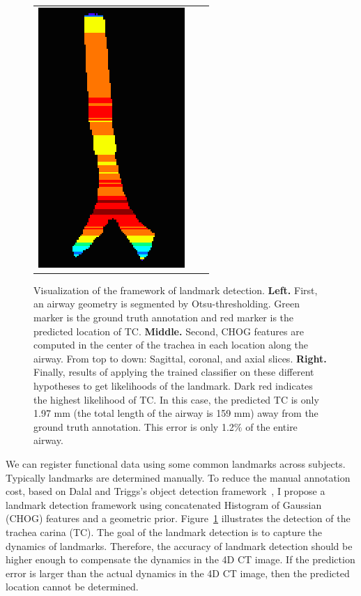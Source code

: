 \begin{figure}[tb]
\begin{center}
\begin{tabular}{ccc}
    \includegraphics[height=\figheight] {fig/Fleck_005_likelihood.png}
    \end{tabular}
    \caption{ \label{fig:detection} Visualization of the framework of landmark detection. {\bf Left.} First, an airway geometry is segmented by Otsu-thresholding. Green marker is the ground truth annotation and red marker is the predicted location of TC. {\bf Middle.} Second, CHOG features are computed in the center of the trachea in each location along the airway. From top to down: Sagittal, coronal, and axial slices. {\bf Right.} Finally, results of applying the trained classifier on these different hypotheses to get likelihoods of the landmark. Dark red indicates the highest likelihood of TC. In this case, the predicted TC is only 1.97 mm (the total length of the airway is 159 mm) away from the ground truth annotation. This error is only 1.2$\%$ of the entire airway.
    }
  \end{center}
\end{figure}

We can register functional data using some common landmarks across subjects.
Typically landmarks are determined manually.
To reduce the manual annotation cost, based on Dalal and Triggs's object detection framework~\cite{dalal2005histograms}, I propose a landmark detection framework using concatenated Histogram of Gaussian (CHOG) features and a geometric prior. 
Figure~\ref{fig:detection} illustrates the detection of the trachea carina (TC).
The goal of the landmark detection is to capture the dynamics of landmarks.
Therefore, the accuracy of landmark detection should be higher enough to compensate the dynamics in the 4D CT image.
If the prediction error is larger than the actual dynamics in the 4D CT image, then the predicted location cannot be determined.

